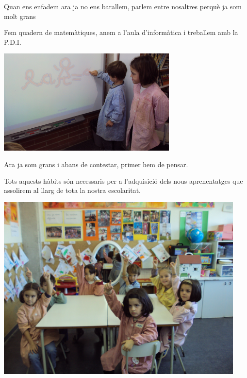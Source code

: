 \begin{news}
Quan ens enfadem ara ja no ens barallem, parlem entre nosaltres perquè ja som molt grans

Fem quadern de matemàtiques, anem a l’aula d’informàtica i treballem amb la P.D.I.


\noindent\includegraphics[width=9cm,keepaspectratio]{parvulari/img/foto6b.jpg}


Ara ja som grans i abans de contestar,  primer hem de pensar.


Tots aquests hàbits són  necessaris per a l’adquisició dels nous aprenentatges que assolirem al llarg de tota la nostra escolaritat.



\end{news}

\noindent\includegraphics[width=12.5cm,keepaspectratio]{parvulari/img/foto7.jpg}
